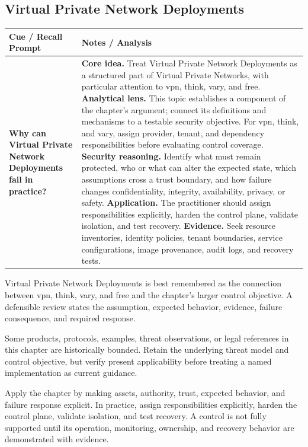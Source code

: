 \documentclass[11pt]{article}
\newcommand{\CornellHeader}{%
\rowcolor{Navy}\color{white}\bfseries Cue / Recall Prompt & \color{white}\bfseries Notes / Analysis\\\hline}
\newcommand{\CornellRow}[2]{%
\cellcolor{CueGray}\RaggedRight\textbf{#1} & \RaggedRight #2\\\hline}
\begin{document}
\subsection*{Virtual Private Network Deployments}
\begin{longtable}{>{\RaggedRight\arraybackslash}p{}|>{\RaggedRight\arraybackslash}p{}}
\CornellHeader
\CornellRow{Why can Virtual Private Network Deployments fail in practice?}{\textbf{Core idea.} Treat Virtual Private Network Deployments as a structured part of Virtual Private Networks, with particular attention to vpn, think, vary, and free. \textbf{Analytical lens.} This topic establishes a component of the chapter's argument; connect its definitions and mechanisms to a testable security objective. For vpn, think, and vary, assign provider, tenant, and dependency responsibilities before evaluating control coverage. \textbf{Security reasoning.} Identify what must remain protected, who or what can alter the expected state, which assumptions cross a trust boundary, and how failure changes confidentiality, integrity, availability, privacy, or safety. \textbf{Application.} The practitioner should assign responsibilities explicitly, harden the control plane, validate isolation, and test recovery. \textbf{Evidence.} Seek resource inventories, identity policies, tenant boundaries, service configurations, image provenance, audit logs, and recovery tests.}
\end{longtable}
\begin{topicsummary}
Virtual Private Network Deployments is best remembered as the connection between vpn, think, vary, and free and the chapter's larger control objective. A defensible review states the assumption, expected behavior, evidence, failure consequence, and required response.
\end{topicsummary}
\begin{historybox}
Some products, protocols, examples, threat observations, or legal references in this chapter are historically bounded. Retain the underlying threat model and control objective, but verify present applicability before treating a named implementation as current guidance.
\end{historybox}
\begin{defensebox}
Apply the chapter by making assets, authority, trust, expected behavior, and failure response explicit. In practice, assign responsibilities explicitly, harden the control plane, validate isolation, and test recovery. A control is not fully supported until its operation, monitoring, ownership, and recovery behavior are demonstrated with evidence.
\end{defensebox}
\end{document}

